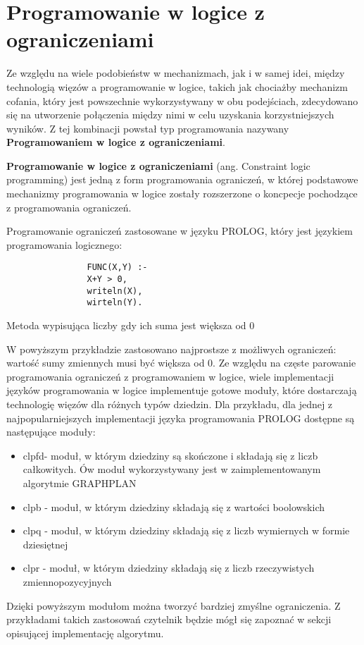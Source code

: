 \section{Programowanie w logice z ograniczeniami}
    Ze względu na wiele podobieństw w mechanizmach, jak i w samej idei, między technologią więzów a programowanie w logice, takich jak chociażby mechanizm cofania, który jest 
    powszechnie wykorzystywany w obu podejściach, zdecydowano się na utworzenie połączenia między nimi w celu uzyskania korzystniejszych wyników. Z tej kombinacji powstał 
    typ programowania nazywany \textbf{Programowaniem w logice z ograniczeniami}.
    \begin{definition}
        \textbf{Programowanie w logice z ograniczeniami} (ang. Constraint logic programming) jest jedną z form programowania ograniczeń,
        w której podstawowe mechanizmy programowania w logice zostały rozszerzone o koncpecje pochodzące z programowania ograniczeń.
    \end{definition}

    \begin{example}
        Programowanie ograniczeń zastosowane w języku PROLOG, który jest językiem programowania logicznego:
        \begin{listing}[H]
            \begin{verbatim}
                FUNC(X,Y) :-
                X+Y > 0,
                writeln(X),
                wirteln(Y).
            \end{verbatim}
            \caption{Metoda wypisująca liczby gdy ich suma jest większa od 0}
        \end{listing}
    \end{example}
    W powyższym przykładzie zastosowano najprostsze z możliwych ograniczeń: wartość sumy zmiennych musi być większa od 0. 
    Ze względu na częste parowanie programowania ograniczeń z programowaniem w logice, wiele implementacji języków programowania w 
    logice implementuje gotowe moduły, które dostarczają technologię więzów dla różnych typów dziedzin. Dla przykładu, dla 
    jednej z najpopularniejszych implementacji języka programowania PROLOG dostępne są następujące moduły:
    \begin{itemize}
        \item clpfd- moduł, w którym dziedziny są skończone i składają się z liczb całkowitych. Ów moduł 
        wykorzystywany jest w zaimplementowanym algorytmie GRAPHPLAN
        \item clpb - moduł, w którym dziedziny składają się z wartości boolowskich
        \item clpq - moduł, w którym dziedziny składają się z liczb wymiernych w formie dziesiętnej
        \item clpr - moduł, w którym dziedziny składają się z liczb rzeczywistych zmiennopozycyjnych 
    \end{itemize}
    Dzięki powyższym modułom można tworzyć bardziej zmyślne ograniczenia. Z przykładami takich zastosowań
    czytelnik będzie mógł się zapoznać w sekcji opisującej implementację algorytmu.

